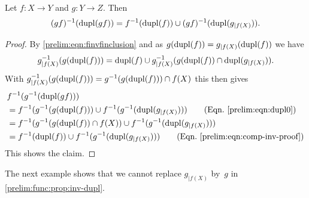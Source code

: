 \begin{proposition} \label{prelim:func:prop:inv-dupl}
	Let $f \colon X \to Y$ and $g \colon Y \to Z$. Then
	\[
	(\concat{f}{g})^{-1}(\dupl{\concat{f}{g}})
	= f^{-1}(\dupl{f}) \cup (\concat{f}{g})^{-1}(\dupl{g_{|f(X)}}).
	\]	 
\end{proposition}
\begin{proof}
	By \cref{prelim:eqn:finvfinclusion} and as $g(\dupl{f}) = g_{|f(X)}(\dupl{f})$
	we have 
	\begin{equation} \label{prelim:eqn:comp-inv-proof}
		g_{|f(X)}^{-1}(g(\dupl{f})) = \dupl{f} \cup g_{|f(X)}^{-1}(g(\dupl{f})\cap \dupl{g_{|f(X)}}).
	\end{equation}
	With $g_{|f(X)}^{-1}(g(\dupl{f})) = g^{-1}(g(\dupl{f})) \cap f(X)$
	this then gives
	\begin{align*}
		& f^{-1}(g^{-1}(\dupl{\concat{f}{g}})) \\
		& = f^{-1}(g^{-1}(g(\dupl{f}))\cup f^{-1}(g^{-1}(\dupl{g_{|f(X)}})) \tag{Eqn.~\eqref{prelim:eqn:dupl0}} \\
		& = f^{-1}(g^{-1}(g(\dupl{f}) \cap f(X)) \cup f^{-1}(g^{-1}(\dupl{g_{|f(X)}})) \\
		& = f^{-1}(\dupl{f}) \cup f^{-1}(g^{-1}(\dupl{g_{|f(X)}})) \tag{Eqn.~\eqref{prelim:eqn:comp-inv-proof}}		
	\end{align*}
	This shows the claim.
\end{proof}

The next example shows that we cannot replace $g_{|f(X)}$ by~$g$ in \cref{prelim:func:prop:inv-dupl}.

